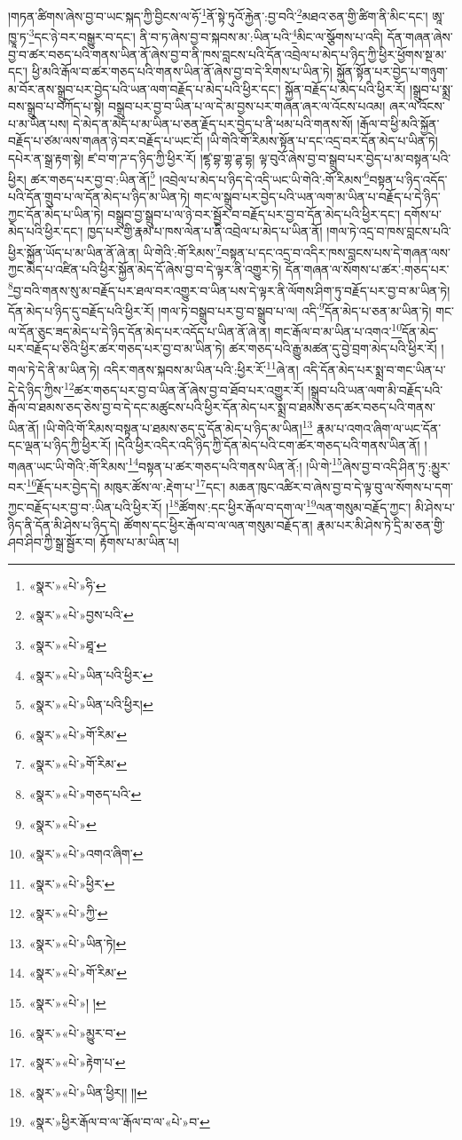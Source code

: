 །གཏན་ཚིགས་ཞེས་བྱ་བ་ཡང་སྐད་ཀྱི་བྱིངས་ལ་ཧོ་\footnote{«སྣར་»«པེ་»ཧི་}ནོ་སྟེ་ཏུའོ་རྐྱེན་:བྱ་བའི་\footnote{«སྣར་»«པེ་»བྱས་པའི་}མཐའ་ཅན་གྱི་ཚིག་ནི་མིང་དང་། ཨཱ་ཁྱཱ་ཏ་\footnote{«སྣར་»«པེ་»ཐཱ་}དང་ཉེ་བར་བསྒྱུར་བ་དང་། ནི་བ་ཏ་ཞེས་བྱ་བ་སྐབས་མ་:ཡིན་པའི་\footnote{«སྣར་»«པེ་»ཡིན་པའི་ཕྱིར་}མིང་ལ་སྩོགས་པ་འདི། དོན་གཞན་ཞེས་བྱ་བ་ཚར་བཅད་པའི་གནས་ཡིན་ནོ་ཞེས་བྱ་བ་ནི་ཁས་བླངས་པའི་དོན་འབྲེལ་པ་མེད་པ་ཉིད་ཀྱི་ཕྱིར་ཕྱོགས་སྔ་མ་དང་། ཕྱི་མའི་རྒོལ་བ་ཚར་གཅད་པའི་གནས་ཡིན་ནོ་ཞེས་བྱ་བ་དེ་རིགས་པ་ཡིན་ཏེ། སྐྱོན་སྟོན་པར་བྱེད་པ་གཉུག་མ་བོར་ནས་སྒྲུབ་པར་བྱེད་པའི་ཡན་ལག་བརྗོད་པ་མེད་པའི་ཕྱིར་དང་། སྐྱོན་བརྗོད་པ་མེད་པའི་ཕྱིར་རོ། །སྒྲུབ་པ་སྨྲ་བས་སྒྲུབ་པ་བཀོད་པ་སྟེ། བསྒྲུབ་པར་བྱ་བ་ཡིན་པ་ལ་དེ་མ་བྱས་པར་གཞན་ཞར་ལ་འོངས་པའམ། ཞར་ལ་འོངས་པ་མ་ཡིན་པས། དེ་མེད་ན་མེད་པ་མ་ཡིན་པ་ཅན་རྗོད་པར་བྱེད་པ་ནི་ཕམ་པའི་གནས་སོ། །རྒོལ་བ་ཕྱི་མའི་སྐྱོན་བརྗོད་པ་ཙམ་ལས་གཞན་ཉེ་བར་བརྗོད་པ་ཡང་ངོ། །ཡི་གེའི་གོ་རིམས་སྟོན་པ་དང་འདྲ་བར་དོན་མེད་པ་ཡིན་ཏེ། དཔེར་ན་སྒྲ་རྟག་སྟེ། ཛ་བ་ག་ཌ་ད་ཉིད་ཀྱི་ཕྱིར་རོ། །ཛྷ་བྷ་གྷ་ཌྷ་དྷ། ལྟ་བུའོ་ཞེས་བྱ་བ་སྒྲུབ་པར་བྱེད་པ་མ་བསྟན་པའི་ཕྱིར། ཚར་གཅད་པར་བྱ་བ་:ཡིན་ནོ།\footnote{«སྣར་»«པེ་»ཡིན་པའི་ཕྱིར།} །འབྲེལ་པ་མེད་པ་ཉིད་དེ་འདི་ཡང་ཡི་གེའི་:གོ་རིམས་\footnote{«སྣར་»«པེ་»གོ་རིམ་}བསྟན་པ་ཉིད་འདོད་པའི་དོན་གྲུབ་པ་ལ་དོན་མེད་པ་ཉིད་མ་ཡིན་ཏེ། གང་ལ་སྒྲུབ་པར་བྱེད་པའི་ཡན་ལག་མ་ཡིན་པ་བརྗོད་པ་དེ་ཉིད་ཀྱང་དོན་མེད་པ་ཡིན་ཏེ། བསྒྲུབ་བྱ་སྒྲུབ་པ་ལ་ཉེ་བར་སྦྱོར་བ་བརྗོད་པར་བྱ་བ་དོན་མེད་པའི་ཕྱིར་དང་། དགོས་པ་མེད་པའི་ཕྱིར་དང་། ཁྱད་པར་གྱི་རྣམ་པ་ཁས་ལེན་པ་ནི་འབྲེལ་པ་མེད་པ་ཡིན་ནོ། །གལ་ཏེ་འདྲ་བ་ཁས་བླངས་པའི་ཕྱིར་སྐྱོན་ཡོད་པ་མ་ཡིན་ནོ་ཞེ་ན། ཡི་གེའི་:གོ་རིམས་\footnote{«སྣར་»«པེ་»གོ་རིམ་}བསྟན་པ་དང་འདྲ་བ་འདིར་ཁས་བླངས་པས་དེ་གཞན་ལས་ཀྱང་མེད་པ་འཛིན་པའི་ཕྱིར་སྐྱོན་མེད་དོ་ཞེས་བྱ་བ་དེ་ལྟར་ནི་འགྱུར་ཏེ། དོན་གཞན་ལ་སོགས་པ་ཚར་:གཅད་པར་\footnote{«སྣར་»«པེ་»གཅད་པའི་}བྱ་བའི་གནས་སུ་མ་བརྗོད་པར་ཐལ་བར་འགྱུར་བ་ཡིན་པས་དེ་ལྟར་ནི་ལོགས་ཤིག་ཏུ་བརྗོད་པར་བྱ་བ་མ་ཡིན་ཏེ། དོན་མེད་པ་ཉིད་དུ་བརྗོད་པའི་ཕྱིར་རོ། །གལ་ཏེ་བསྒྲུབ་པར་བྱ་བ་སྒྲུབ་པ་ལ། འདི་\footnote{«སྣར་»«པེ་»}དོན་མེད་པ་ཅན་མ་ཡིན་ཏེ། གང་ལ་དོན་ཅུང་ཟད་མེད་པ་དེ་ཉིད་དོན་མེད་པར་འདོད་པ་ཡིན་ནོ་ཞེ་ན། གང་རྒོལ་བ་མ་ཡིན་པ་འགའ་\footnote{«སྣར་»«པེ་»འགའ་ཞིག་}དོན་མེད་པར་བརྗོད་པ་ཅིའི་ཕྱིར་ཚར་གཅད་པར་བྱ་བ་མ་ཡིན་ཏེ། ཚར་གཅད་པའི་རྒྱུ་མཚན་དུ་བྱེ་བྲག་མེད་པའི་ཕྱིར་རོ། །གལ་ཏེ་དེ་ནི་མ་ཡིན་ཏེ། འདིར་གནས་སྐབས་མ་ཡིན་པའི་:ཕྱིར་རོ་\footnote{«སྣར་»«པེ་»ཕྱིར་}ཞེ་ན། འདི་དོན་མེད་པར་སྨྲ་བ་གང་ཡིན་པ་དེ་དེ་ཉིད་ཀྱིས་\footnote{«སྣར་»«པེ་»ཀྱི་}ཚར་གཅད་པར་བྱ་བ་ཡིན་ནོ་ཞེས་བྱ་བ་ཐོབ་པར་འགྱུར་རོ། །སྒྲུབ་པའི་ཡན་ལག་མི་བརྗོད་པའི་རྒོལ་བ་ཐམས་ཅད་ཅེས་བྱ་བ་དེ་དང་མཚུངས་པའི་ཕྱིར་དོན་མེད་པར་སྨྲ་བ་ཐམས་ཅད་ཚར་བཅད་པའི་གནས་ཡིན་ནོ། །ཡི་གེའི་གོ་རིམས་བསྟན་པ་ཐམས་ཅད་དུ་དོན་མེད་པ་ཉིད་མ་ཡིན།\footnote{«སྣར་»«པེ་»ཡིན་ཏེ།} རྣམ་པ་འགའ་ཞིག་ལ་ཡང་དོན་དང་ལྡན་པ་ཉིད་ཀྱི་ཕྱིར་རོ། །དེའི་ཕྱིར་འདིར་འདི་ཉིད་ཀྱི་དོན་མེད་པའི་ངག་ཚར་གཅད་པའི་གནས་ཡིན་ནོ། །གཞན་ཡང་ཡི་གེའི་:གོ་རིམས་\footnote{«སྣར་»«པེ་»གོ་རིམ་}བསྟན་པ་ཚར་གཅད་པའི་གནས་ཡིན་ནོ:། །ཡི་གེ་\footnote{«སྣར་»«པེ་»། །}ཞེས་བྱ་བ་འདི་ཤིན་ཏུ་:མྱུར་བར་\footnote{«སྣར་»«པེ་»མྱུར་བ་}རྗོད་པར་བྱེད་དེ། མཁུར་ཚོས་ལ་:རྡེག་པ་\footnote{«སྣར་»«པེ་»རྟེག་པ་}དང་། མཆན་ཁུང་འཚིར་བ་ཞེས་བྱ་བ་དེ་ལྟ་བུ་ལ་སོགས་པ་དག་ཀྱང་བརྗོད་པར་བྱ་བ་:ཡིན་པའི་ཕྱིར་རོ། །\footnote{«སྣར་»«པེ་»ཡིན་ཕྱིར།། །།}ཚོགས་:དང་ཕྱིར་རྒོལ་བ་དག་ལ་\footnote{«སྣར་»ཕྱིར་རྒོལ་བ་ལ་་རྒོལ་བ་ལ་«པེ་»བ་}ལན་གསུམ་བརྗོད་ཀྱང་། མི་ཤེས་པ་ཉིད་ནི་དོན་མི་ཤེས་པ་ཉིད་དེ། ཚོགས་དང་ཕྱིར་རྒོལ་བ་ལ་ལན་གསུམ་བརྗོད་ན། རྣམ་པར་མི་ཤེས་ཏེ་དྲི་མ་ཅན་གྱི་ཤབ་ཤིབ་ཀྱི་སྒྲ་སྦྱོར་བ། རྟོགས་པ་མ་ཡིན་པ། 